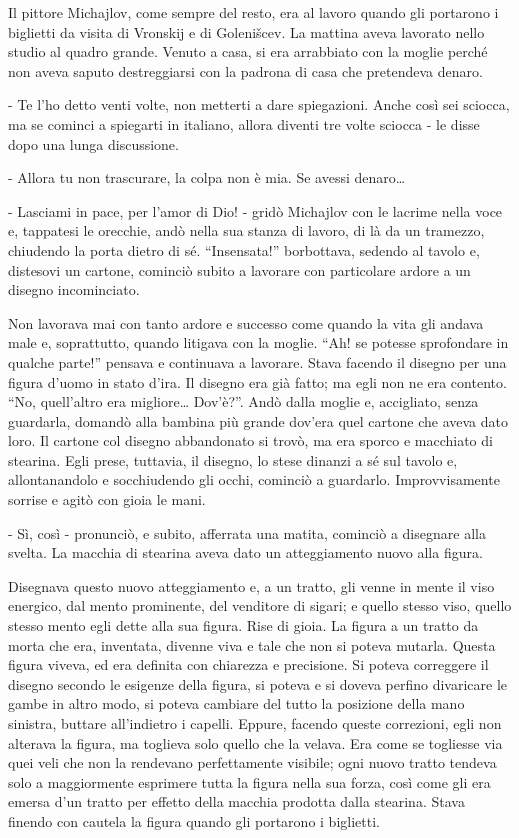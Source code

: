 \label{x-4} 

Il pittore Michajlov, come sempre del resto, era al lavoro quando gli portarono i biglietti da visita di Vronskij e di Golenišcev. La mattina aveva lavorato nello studio al quadro grande. Venuto a casa, si era arrabbiato con la moglie perché non aveva saputo destreggiarsi con la padrona di casa che pretendeva denaro. 

- Te l'ho detto venti volte, non metterti a dare spiegazioni. Anche così sei sciocca, ma se cominci a spiegarti in italiano, allora diventi tre volte sciocca - le disse dopo una lunga discussione. 

- Allora tu non trascurare, la colpa non è mia. Se avessi denaro\ldots{} 

- Lasciami in pace, per l'amor di Dio! - gridò Michajlov con le lacrime nella voce e, tappatesi le orecchie, andò nella sua stanza di lavoro, di là da un tramezzo, chiudendo la porta dietro di sé. ``Insensata!'' borbottava, sedendo al tavolo e, distesovi un cartone, cominciò subito a lavorare con particolare ardore a un disegno incominciato. 

Non lavorava mai con tanto ardore e successo come quando la vita gli andava male e, soprattutto, quando litigava con la moglie. ``Ah! se potesse sprofondare in qualche parte!'' pensava e continuava a lavorare. Stava facendo il disegno per una figura d'uomo in stato d'ira. Il disegno era già fatto; ma egli non ne era contento. ``No, quell'altro era migliore\ldots{} Dov'è?''. Andò dalla moglie e, accigliato, senza guardarla, domandò alla bambina più grande dov'era quel cartone che aveva dato loro. Il cartone col disegno abbandonato si trovò, ma era sporco e macchiato di stearina. Egli prese, tuttavia, il disegno, lo stese dinanzi a sé sul tavolo e, allontanandolo e socchiudendo gli occhi, cominciò a guardarlo. Improvvisamente sorrise e agitò con gioia le mani. 

- Sì, così - pronunciò, e subito, afferrata una matita, cominciò a disegnare alla svelta. La macchia di stearina aveva dato un atteggiamento nuovo alla figura. 

Disegnava questo nuovo atteggiamento e, a un tratto, gli venne in mente il viso energico, dal mento prominente, del venditore di sigari; e quello stesso viso, quello stesso mento egli dette alla sua figura. Rise di gioia. La figura a un tratto da morta che era, inventata, divenne viva e tale che non si poteva mutarla. Questa figura viveva, ed era definita con chiarezza e precisione. Si poteva correggere il disegno secondo le esigenze della figura, si poteva e si doveva perfino divaricare le gambe in altro modo, si poteva cambiare del tutto la posizione della mano sinistra, buttare all'indietro i capelli. Eppure, facendo queste correzioni, egli non alterava la figura, ma toglieva solo quello che la velava. Era come se togliesse via quei veli che non la rendevano perfettamente visibile; ogni nuovo tratto tendeva solo a maggiormente esprimere tutta la figura nella sua forza, così come gli era emersa d'un tratto per effetto della macchia prodotta dalla stearina. Stava finendo con cautela la figura quando gli portarono i biglietti. 

